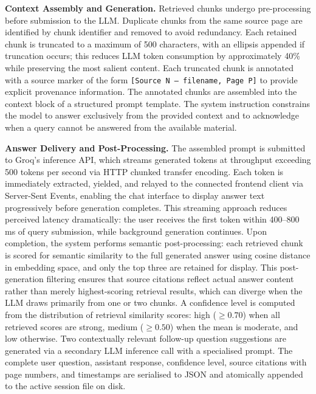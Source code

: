 \textbf{Context Assembly and Generation.} Retrieved chunks undergo pre-processing before submission to the LLM. Duplicate chunks from the same source page are identified by chunk identifier and removed to avoid redundancy. Each retained chunk is truncated to a maximum of 500 characters, with an ellipsis appended if truncation occurs; this reduces LLM token consumption by approximately 40\% while preserving the most salient content. Each truncated chunk is annotated with a source marker of the form \texttt{[Source N --- filename, Page P]} to provide explicit provenance information. The annotated chunks are assembled into the context block of a structured prompt template. The system instruction constrains the model to answer exclusively from the provided context and to acknowledge when a query cannot be answered from the available material.

\textbf{Answer Delivery and Post-Processing.} The assembled prompt is submitted to Groq's inference API, which streams generated tokens at throughput exceeding 500 tokens per second via HTTP chunked transfer encoding. Each token is immediately extracted, yielded, and relayed to the connected frontend client via Server-Sent Events, enabling the chat interface to display answer text progressively before generation completes. This streaming approach reduces perceived latency dramatically: the user receives the first token within 400--800\,ms of query submission, while background generation continues. Upon completion, the system performs semantic post-processing: each retrieved chunk is scored for semantic similarity to the full generated answer using cosine distance in embedding space, and only the top three are retained for display. This post-generation filtering ensures that source citations reflect actual answer content rather than merely highest-scoring retrieval results, which can diverge when the LLM draws primarily from one or two chunks. A confidence level is computed from the distribution of retrieval similarity scores: high ($\geq 0.70$) when all retrieved scores are strong, medium ($\geq 0.50$) when the mean is moderate, and low otherwise. Two contextually relevant follow-up question suggestions are generated via a secondary LLM inference call with a specialised prompt. The complete user question, assistant response, confidence level, source citations with page numbers, and timestamps are serialised to JSON and atomically appended to the active session file on disk.

